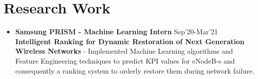 \documentclass{article}
\begin{document}
\begin{itemize}

\end{itemize}



\section*{Research Work}
\begin{itemize}
    \item{\textbf{\large{Samsung PRISM - Machine Learning Intern}}} \hfill \textmd{Sep'20-Mar'21}
          \newline
          \textbf{Intelligent Ranking for Dynamic Restoration of Next Generation Wireless Networks}
          \newline
          \textmd{- Implemented Machine Learning algorithms and Feature Engineering techniques to predict KPI values for eNodeB-s and consequently a ranking system to orderly restore them during network failure.}
\end{itemize}

\end{document}
